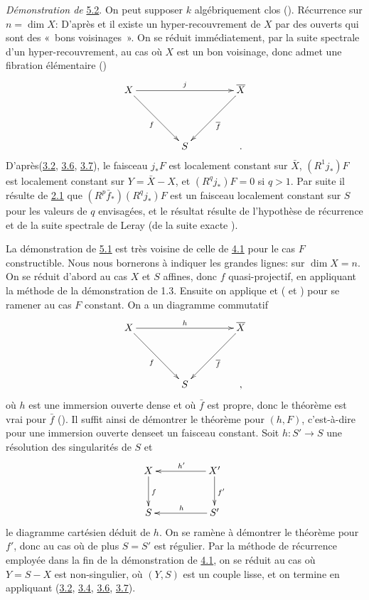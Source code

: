 \documentclass[10pt]{../fichiers-configuration-latex/smfart}
\begin{document}
\noindent
\emph{Démonstration de} \hyperref[XVI.thm5.2]{5.2}. On peut supposer $k$
algébriquement clos ().
Récurrence sur $n=\dim X$: D'après  et il existe un
hyper-recouvrement de $X$ par des ouverts qui sont des « bons
voisinages ». On se réduit immédiatement, par la suite spectrale
d'un hyper-recouvrement, au cas où $X$ est un bon voisinage, donc
admet une fibration élémentaire ()
$$
\xymatrix@=1.5cm{
X \ar[rr]^{j} \ar[rd]_{f}&         &
\bar{X}\ar[ld]^{\bar{f}} \\
             &      S  & .
}
$$
D'après\pageoriginale (\hyperref[XVI.prop3.2]{3.2}, \hyperref[XVI.cor3.6]{3.6}, \hyperref[XVI.thm3.7]{3.7}),
le faisceau $j_{\ast}F$ est
localement constant sur $\bar{X}$, $(R^{1}j_{\ast})F$ est localement
constant sur $Y=\bar{X}-X$, et $(R^{q}j_{\ast})F=0$ si $q>1$. Par
suite il résulte de \hyperref[XVI.thm2.1]{2.1} que $(R^{p}\bar{f}_{\ast})(R^{q}j_{\ast})F$
est un faisceau localement constant sur $S$ pour les valeurs de $q$
envisagées, et le résultat résulte de l'hypothèse de récurrence et de
la suite spectrale de Leray (\resp de la suite exacte ).

La démonstration de \hyperref[XVI.thm5.1]{5.1} est très voisine 
de celle de \hyperref[XVI.thm4.1]{4.1} pour le cas
$F$ constructible. Nous nous bornerons à indiquer les grandes lignes:
 sur $\dim X=n$. On se réduit d'abord au cas $X$ et $S$
affines, donc $f$ quasi-projectif, en appliquant la méthode de la
démonstration de 1.3. Ensuite on applique  et ( et )
pour se ramener au cas $F$ constant. On a un diagramme commutatif
$$
\xymatrix@=1.5cm{
X \ar[rr]^{h} \ar[rd]_{f}&         &                  \bar{X}\ar[ld]^{\bar{f}}\\
             &      S  & ,                  
}
$$
où $h$ est une immersion ouverte dense et où $\bar{f}$ est propre,
donc le théorème est vrai pour $\bar{f}$ (). Il suffit ainsi de
démontrer le théorème pour $(h,F)$, c'est-à-dire pour une immersion
ouverte dense\pageoriginale et un faisceau constant. Soit
$h:S'\rightarrow S$ une résolution des singularités de $S$ et
$$
\xymatrix@C=1.75cm@R=1cm{
X  \ar[d]^{f} & X' \ar[l]_{h'} \ar[d]^{f'}\\
S          & S' \ar[l]_{h} 
}
$$
le diagramme cartésien déduit de $h$. On se ramène à démontrer le
théorème pour $f'$, donc au cas où de plus $S=S'$ est régulier. Par la
méthode de récurrence employée dans la fin de la démonstration de \hyperref[XVI.thm4.1]{4.1},
on se réduit au cas où $Y=S-X$ est non-singulier, \ie où $(Y,S)$ est
un couple lisse, et on termine en appliquant (\hyperref[XVI.prop3.2]{3.2}, \hyperref[XVI.cor3.4]{3.4},
\hyperref[XVI.cor3.6]{3.6}, \hyperref[XVI.thm3.7]{3.7}).
\end{document}
